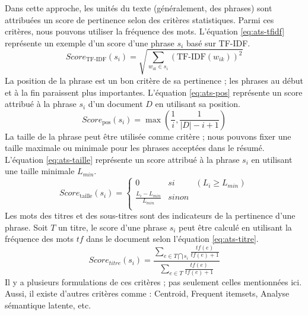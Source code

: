 \documentclass{KodeBook}
\begin{document}
Dans cette approche, les unités du texte (généralement, des phrases) sont attribuées un score de pertinence selon des critères statistiques.
Parmi ces critères, nous pouvons utiliser la fréquence des mots. 
L'équation \ref{eq:ats-tfidf} représente un exemple d'un score d'une phrase $s_i$ basé sur TF-IDF. 
\begin{equation}\label{eq:ats-tfidf}
Score_\text{TF-IDF}(s_i) = \sqrt{\sum\limits_{w_{ik} \in s_i} (\text{TF-IDF}(w_{ik}))^2}
\end{equation}
La position de la phrase est un bon critère de sa pertinence ; les phrases au début et à la fin paraissent plus importantes.
L'équation \ref{eq:ats-pos} représente un score attribué à la phrase $s_i$ d'un document $D$ en utilisant sa position.
\begin{equation}\label{eq:ats-pos}
Score_\text{pos}(s_i) = \max (\frac{1}{i}, \frac{1}{|D| - i + 1})
\end{equation}
La taille de la phrase peut être utilisée comme critère ; nous pouvons fixer une taille maximale ou minimale pour les phrases acceptées dans le résumé.
L'équation \ref{eq:ats-taille} représente un score attribué à la phrase $s_i$ en utilisant une taille minimale $L_{min}$.
\begin{equation}\label{eq:ats-taille}
Score_\text{taille}(s_i) = \left\lbrace 
\begin{array}{lll}
0 & si & (L_i \geq L_{min}) \\
\frac{L_i - L_{min}}{L_{min}} & sinon & \\
\end{array}
\right.
\end{equation}
Les mots des titres et des sous-titres sont des indicateurs de la pertinence d'une phrase. 
Soit $T$ un titre, le score d'une phrase $s_i$ peut être calculé en utilisant la fréquence des mots $tf$ dans le document selon l'équation \ref{eq:ats-titre}.
\begin{equation}\label{eq:ats-titre}
Score_{titre}(s_i) = \frac{\sum_{e \in T \bigcap s_i}{\frac{tf(e)}{tf(e)+1}}}
{\sum_{e \in T}{\frac{tf(e)}{tf(e)+1}}}
\end{equation}
Il y a plusieurs formulations de ces critères ; pas seulement celles mentionnées ici. 
Aussi, il existe d'autres critères comme : Centroid, Frequent itemsets, Analyse sémantique latente, etc.
\end{document}
